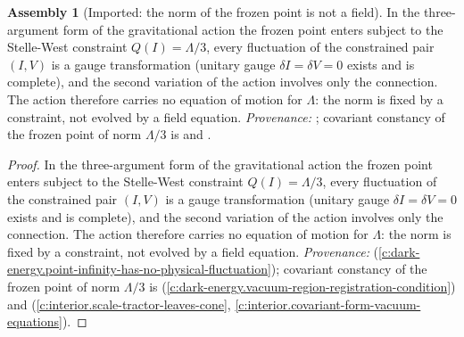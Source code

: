 \documentclass[11pt]{article}
\theoremstyle{definition}
\newtheorem{assembled}[theorem]{Assembly}
\theoremstyle{plain}
\newcommand{\changedmark}[2]{\marginpar{\raggedright\scriptsize\color{#1}#2}}
\begin{document}
\begin{assembled}[Imported: the norm of the frozen point is not a field]\label{c:standard-model.imported-norm-frozen-point-not-field}
\changedmark{gray}{reworded}
In the three-argument form of the gravitational action the frozen point enters subject to the Stelle-West constraint $Q(I) = \Lambda/3$, every fluctuation of the constrained pair $(I, V)$ is a gauge transformation (unitary gauge $\delta I = \delta V = 0$ exists and is complete), and the second variation of the action involves only the connection. The action therefore carries no equation of motion for $\Lambda$: the norm is fixed by a constraint, not evolved by a field equation. \emph{Provenance:} \cite[Prop.~5.4]{ButlerT10}; covariant constancy of the frozen point of norm $\Lambda/3$ is \cite[Prop.~4.2(i)]{ButlerT10} and \cite[Thms.~4.5, 4.7]{ButlerT6}.
\end{assembled}
\begin{proof}
In the three-argument form of the gravitational action the frozen point enters subject to the Stelle-West constraint $Q(I) = \Lambda/3$, every fluctuation of the constrained pair $(I, V)$ is a gauge transformation (unitary gauge $\delta I = \delta V = 0$ exists and is complete), and the second variation of the action involves only the connection. The action therefore carries no equation of motion for $\Lambda$: the norm is fixed by a constraint, not evolved by a field equation. \emph{Provenance:} \cite[Prop.~5.4]{ButlerT10} (\ref{c:dark-energy.point-infinity-has-no-physical-fluctuation}); covariant constancy of the frozen point of norm $\Lambda/3$ is \cite[Prop.~4.2(i)]{ButlerT10} (\ref{c:dark-energy.vacuum-region-registration-condition}) and \cite[Thms.~4.5, 4.7]{ButlerT6} (\ref{c:interior.scale-tractor-leaves-cone}, \ref{c:interior.covariant-form-vacuum-equations}).

\end{proof}
\end{document}
